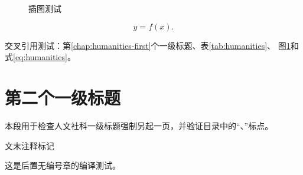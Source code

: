 \documentclass[humanities,nobibliography]{yibinthesis}
\makeatletter
\newcommand{\yibinassertheadingindent}[1]{%
  \if@afterindent\else
    \PackageError{yibinthesis-smoke}{#1 suppresses the following paragraph indent}{}
  \fi
  \ifdim\parindent=2em\relax\else
    \PackageError{yibinthesis-smoke}{#1 changed parindent from two em}{}
  \fi
}
\makeatother
\begin{document}
\begin{figure}[htbp]
  \centering
  \fbox{\rule{0pt}{2cm}\rule{5cm}{0pt}}
  \caption{插图测试}
  \label{fig:humanities}
\end{figure}

\begin{equation}
  y=f(x).
  \label{eq:humanities}
\end{equation}

交叉引用测试：第\ref{chap:humanities-first}个一级标题、表\ref{tab:humanities}、
图\ref{fig:humanities}和式\eqref{eq:humanities}。

\chapter{第二个一级标题}
\yibinassertheadingindent{Second humanities chapter}
本段用于检查人文社科一级标题强制另起一页，并验证目录中的“、”标点。

文末注释标记

\backmatter
\printyibinnotes
\yibinclosingchapter
\yibinassertheadingindent{Humanities closing chapter}
这是后置无编号章的编译测试。
\end{document}
